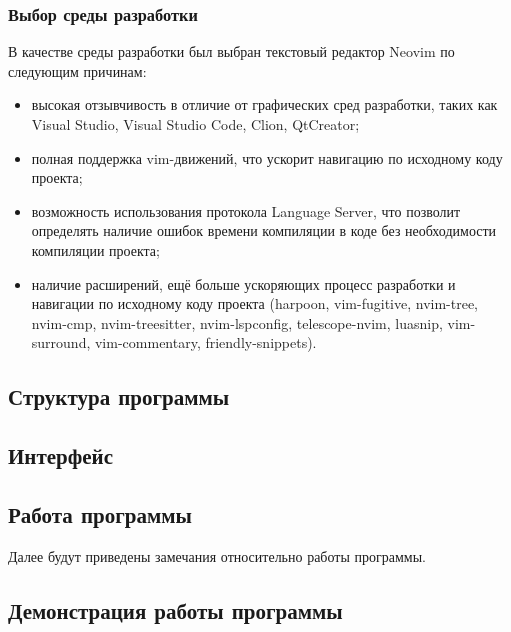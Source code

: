 \subsubsection{Выбор среды разработки}

В качестве среды разработки был выбран текстовый редактор Neovim по следующим причинам:
\begin{itemize}
    \item высокая отзывчивость в отличие от графических сред разработки, таких как Visual Studio, Visual Studio Code, Clion, QtCreator;
    \item полная поддержка vim-движений, что ускорит навигацию по исходному коду проекта;
    \item возможность использования протокола Language Server, что позволит определять наличие ошибок времени компиляции в коде без необходимости компиляции проекта;
    \item наличие расширений, ещё больше ускоряющих процесс разработки и навигации по исходному коду проекта (harpoon, vim-fugitive, nvim-tree, nvim-cmp, nvim-treesitter, nvim-lspconfig, telescope-nvim, luasnip, vim-surround, vim-commentary, friendly-snippets).
\end{itemize}

\subsection{Структура программы}

\subsection{Интерфейс}

\subsection{Работа программы}

Далее будут приведены замечания относительно работы программы.


\subsection{Демонстрация работы программы}
